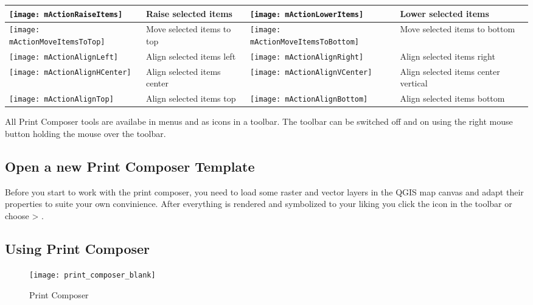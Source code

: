 \begin{table}[h]
\begin{tabular}{|l|p{6.9cm}|l|p{6.9cm}|}
 \hline \texttt{[image: mActionRaiseItems]} & Raise selected
 items  &
 \texttt{[image: mActionLowerItems]} & Lower selected items \\
 \hline \texttt{[image: mActionMoveItemsToTop]} & Move selected
 items to top & 
 \texttt{[image: mActionMoveItemsToBottom]} & Move selected
 items to bottom \\
 \hline \texttt{[image: mActionAlignLeft]} & Align selected 
 items left &
 \texttt{[image: mActionAlignRight]} & Align selected items 
 right \\
 \hline \texttt{[image: mActionAlignHCenter]} & Align selected 
 items center &
 \texttt{[image: mActionAlignVCenter]} & Align selected items
 center vertical \\
 \hline \texttt{[image: mActionAlignTop]} & Align selected
 items top &
 \texttt{[image: mActionAlignBottom]} & Align selected
 items bottom \\
\hline
\end{tabular}
\end{table}

All Print Composer tools are availabe in menus and as icons in a toolbar. The
toolbar can be switched off and on using the right mouse button holding the
mouse over the toolbar.

\subsection{Open a new Print Composer Template}\label{composertemplates}

Before you start to work with the print composer, you need to load some
raster and vector layers in the QGIS map canvas and adapt their properties
to suite your own convinience. After everything is rendered and symbolized to
your liking you click the 
icon in the toolbar or choose  >
.

\subsection{Using Print Composer}\label{label_useprintcomposer} 

\begin{figure}[ht]
   \begin{center}
   \caption{Print Composer \nixcaption}\label{fig:print_composer_blank}\smallskip
   \texttt{[image: print\_composer\_blank]}
\end{center}  
\end{figure}

